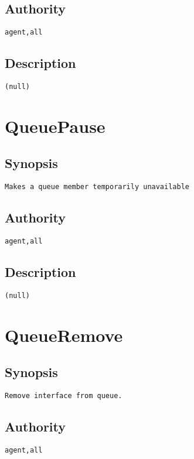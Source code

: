 \subsection{Authority}
\begin{verbatim}
agent,all
\end{verbatim}
\subsection{Description}
\begin{verbatim}
(null)
\end{verbatim}


\section{QueuePause}
\subsection{Synopsis}
\begin{verbatim}
Makes a queue member temporarily unavailable
\end{verbatim}
\subsection{Authority}
\begin{verbatim}
agent,all
\end{verbatim}
\subsection{Description}
\begin{verbatim}
(null)
\end{verbatim}


\section{QueueRemove}
\subsection{Synopsis}
\begin{verbatim}
Remove interface from queue.
\end{verbatim}
\subsection{Authority}
\begin{verbatim}
agent,all
\end{verbatim}
